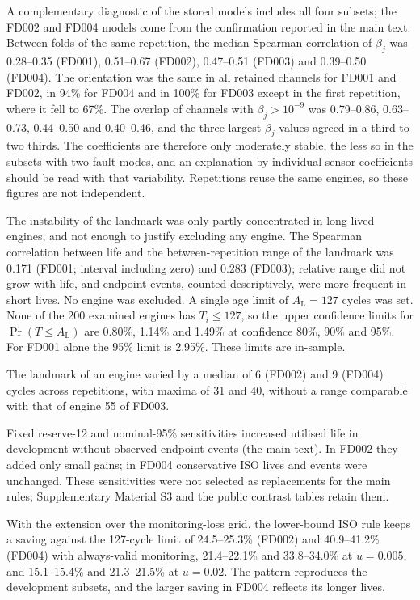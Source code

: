 \documentclass[12pt]{article}
\begin{document}
A complementary diagnostic of the stored models includes all four subsets; the FD002 and FD004 models come from the confirmation reported in the main text. Between folds of the same repetition, the median Spearman correlation of $\beta_j$ was 0.28--0.35 (FD001), 0.51--0.67 (FD002), 0.47--0.51 (FD003) and 0.39--0.50 (FD004). The orientation was the same in all retained channels for FD001 and FD002, in 94\% for FD004 and in 100\% for FD003 except in the first repetition, where it fell to 67\%. The overlap of channels with $\beta_j>10^{-9}$ was 0.79--0.86, 0.63--0.73, 0.44--0.50 and 0.40--0.46, and the three largest $\beta_j$ values agreed in a third to two thirds. The coefficients are therefore only moderately stable, the less so in the subsets with two fault modes, and an explanation by individual sensor coefficients should be read with that variability. Repetitions reuse the same engines, so these figures are not independent.

The instability of the landmark was only partly concentrated in long-lived engines, and not enough to justify excluding any engine. The Spearman correlation between life and the between-repetition range of the landmark was 0.171 (FD001; interval including zero) and 0.283 (FD003); relative range did not grow with life, and endpoint events, counted descriptively, were more frequent in short lives. No engine was excluded. A single age limit of $A_{\mathrm L}=127$ cycles was set. None of the 200 examined engines has $T_i\leq127$, so the upper confidence limits for $\Pr(T\leq A_{\mathrm L})$ are 0.80\%, 1.14\% and 1.49\% at confidence 80\%, 90\% and 95\%. For FD001 alone the 95\% limit is 2.95\%. These limits are in-sample.

The landmark of an engine varied by a median of 6 (FD002) and 9 (FD004) cycles across repetitions, with maxima of 31 and 40, without a range comparable with that of engine 55 of FD003.

Fixed reserve-12 and nominal-95\% sensitivities increased utilised life in development without observed endpoint events (the main text). In FD002 they added only small gains; in FD004 conservative ISO lives and events were unchanged. These sensitivities were not selected as replacements for the main rules; Supplementary Material S3 and the public contrast tables retain them.

With the extension over the monitoring-loss grid, the lower-bound ISO rule keeps a saving against the 127-cycle limit of 24.5--25.3\% (FD002) and 40.9--41.2\% (FD004) with always-valid monitoring, 21.4--22.1\% and 33.8--34.0\% at $u=0.005$, and 15.1--15.4\% and 21.3--21.5\% at $u=0.02$. The pattern reproduces the development subsets, and the larger saving in FD004 reflects its longer lives.
\end{document}
